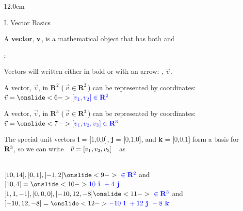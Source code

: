 \begin{frame}
\frametitle{}
\begin{columns}
\begin{column}{12.0cm}

{I. Vector Basics}

\vspace{0.2cm}

\scriptsize

\DEF A {\bf vector}, ${\bf v}$, is a mathematical object that has both  and 

\vspace{0.5cm}

: \\

\vspace{0.2cm}

\OBUL  Vectors will written either in bold or with an arrow: , $\vec{v}$.\\

\vspace{0.2cm}

\OBUL  A vector, $\vec{v}$, in $\mathbf{R}^2$ (\,$\vec{v} \in \mathbf{R}^2$\,) can be represented by  coordinates: \quad $\vec{v} = \ON<6->{\B{\VV \in \mathbf{R}^2}}$\\

\vspace{0.2cm}

\OBUL  A vector, $\vec{v}$, in $\mathbf{R}^3$ (\,$\vec{v} \in \mathbf{R}^3$\,) can be represented by  coordinates: \quad $\vec{v} = \ON<7->{\B{\VVV \in \mathbf{R}^3}}$\\

\vspace{0.2cm}

\OBUL  The special unit vectors {\bf i} = [1,0,0], {\bf j} = [0,1,0], and {\bf k} = [0,0,1] form a basis for $\mathbf{R}^3$, \NEWLINE so we can write \,\, $\vec{v} = [v_1,v_2,v_3]$ \,\, as \,\, 

\vspace{0.5cm}

\EX \\
\vspace{0.1cm}
\OBUL $[10,14], [0,1], [-1,2] \ON<9->{\B{\,\, \in \mathbf{R}^2}}$ \quad and \quad $[10,4] = \ON<10->{\B{10\VI + 4 \VJ}}$\\
\vspace{0.2cm}
\OBUL $[1,1,-1], [0,0,0], [-10,12,-8] \ON<11->{\B{\,\, \in \mathbf{R}^3}}$ \quad and \quad $[-10,12,-8] = \ON<12->{\B{-10\VI + 12 \VJ - 8\VK}}$\\


\end{column}
\end{columns}
\end{frame}
